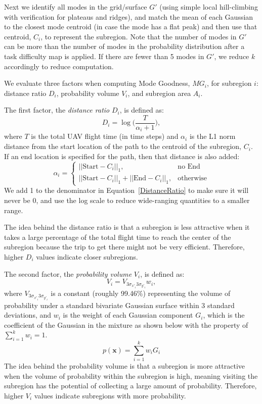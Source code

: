 Next we identify all modes in the grid/surface $G'$ (using simple local hill-climbing with verification for plateaus and ridges), and match the mean of each Gaussian to the closest mode centroid (in case the mode has a flat peak) and then use that centroid, $C_i$, to represent the subregion. Note that the number of modes in $G'$ can be more than the number of modes in the probability distribution after a task difficulty map is applied. If there are fewer than 5 modes in $G'$, we reduce $k$ accordingly to reduce computation.

We evaluate three factors when computing Mode Goodness, $MG_i$, for subregion $i$: distance ratio $D_i$, probability volume $V_i$, and subregion area $A_i$. 

The first factor, the \textit{distance ratio} $D_i$, is defined as:
\begin{equation}
D_i = \log\Big(\frac{T}{\alpha_i+1}\Big),
\label{DistanceRatio}
\end{equation}
where $T$ is the total UAV flight time (in time steps) and $\alpha_i$ is the L1 norm distance from the start location of the path to the centroid of the subregion, $C_i$. If an end location is specified for the path, then that distance is also added:
\begin{equation}
\alpha_i = 
	\left\{
	\begin{array}{ll}
		||\mbox{Start}-C_i||_1, & \mbox{no End} \\
		||\mbox{Start}-C_i||_1 + ||\mbox{End}-C_i||_1, & \mbox{otherwise}
	\end{array}
	\right.
\label{Alpha}
\end{equation}
We add 1 to the denominator in Equation~\ref{DistanceRatio} to make sure it will never be 0, and use the log scale to reduce wide-ranging quantities to a smaller range. 

The idea behind the distance ratio is that a subregion is less attractive when it takes a large percentage of the total flight time to reach the center of the subregion because the trip to get there might not be very efficient. Therefore, higher $D_i$ values indicate closer subregions.

The second factor, the \textit{probability volume} $V_i$, is defined as:
\begin{equation}
V_i = V_{3\sigma_{x'_i}3\sigma_{y'_i}}w_i,
\label{Volume}
\end{equation}
where $V_{3\sigma_{x'_i}3\sigma_{y'_i}}$ is a constant (roughly 99.46\%) representing the volume of probability under a standard bivariate Gaussian surface within 3 standard deviations, and $w_i$ is the weight of each Gaussian component $G_i$, which is the coefficient of the Gaussian in the mixture as shown below with the property of $\sum_{i=1}^k w_i = 1$.
\begin{equation}
p(\mathbf{x}) = \sum_{i=1}^k w_i G_i
\label{Alphas}
\end{equation}
The idea behind the probability volume is that a subregion is more attractive when the volume of probability within the subregion is high, meaning visiting the subregion has the potential of collecting a large amount of probability. Therefore, higher $V_i$ values indicate subregions with more probability.

